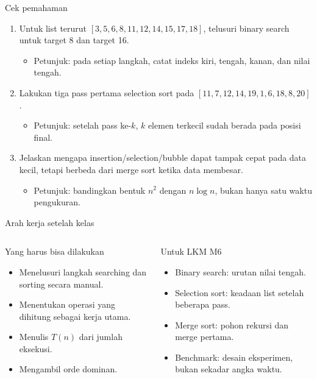 \documentclass[aspectratio=169,11pt]{beamer}
\begin{document}
\begin{frame}{Cek pemahaman}
\begin{enumerate}
\item Untuk list terurut $[3,5,6,8,11,12,14,15,17,18]$, telusuri binary search untuk target 8 dan target 16.
\pause
\begin{itemize}
\item Petunjuk: pada setiap langkah, catat indeks kiri, tengah, kanan, dan nilai tengah.
\end{itemize}
\item Lakukan tiga pass pertama selection sort pada $[11,7,12,14,19,1,6,18,8,20]$.
\pause
\begin{itemize}
\item Petunjuk: setelah pass ke-$k$, $k$ elemen terkecil sudah berada pada posisi final.
\end{itemize}
\item Jelaskan mengapa insertion/selection/bubble dapat tampak cepat pada data kecil, tetapi berbeda dari merge sort ketika data membesar.
\pause
\begin{itemize}
\item Petunjuk: bandingkan bentuk $n^2$ dengan $n\log n$, bukan hanya satu waktu pengukuran.
\end{itemize}
\end{enumerate}
\end{frame}

\begin{frame}{Arah kerja setelah kelas}
\begin{columns}[T]
\begin{block}{Yang harus bisa dilakukan}
\begin{itemize}
\item Menelusuri langkah searching dan sorting secara manual.
\item Menentukan operasi yang dihitung sebagai kerja utama.
\item Menulis $T(n)$ dari jumlah eksekusi.
\item Mengambil orde dominan.
\end{itemize}
\end{block}
\begin{block}{Untuk LKM M6}
\begin{itemize}
\item Binary search: urutan nilai tengah.
\item Selection sort: keadaan list setelah beberapa pass.
\item Merge sort: pohon rekursi dan merge pertama.
\item Benchmark: desain eksperimen, bukan sekadar angka waktu.
\end{itemize}
\end{block}
\end{columns}
\end{frame}
\end{document}
